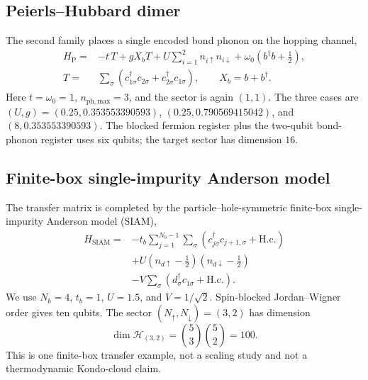 \documentclass[
  reprint,
  amsmath,
  amssymb,
  aps,
  pra,
  nofootinbib,
  superscriptaddress,
  floatfix
]{revtex4-2}
\newcommand{\phmax}{n_{\mathrm{ph,max}}}
\begin{document}
\subsection{Peierls--Hubbard dimer}
\label{sec:peierls_model}

The second family places a single encoded bond phonon on the hopping channel,
\begin{align}
 H_{\mathrm P}
 =&-t\,T+gX_bT
 +U\sum_{i=1}^{2}n_{i\uparrow}n_{i\downarrow}
 +\omega_0\left(b^{\dagger}b+\frac12\right),
 \label{eq:peierls_hamiltonian}\\
 T=&\sum_\sigma
 \left(c_{1\sigma}^{\dagger}c_{2\sigma}
 +c_{2\sigma}^{\dagger}c_{1\sigma}\right),
 \qquad X_b=b+b^{\dagger}.
\end{align}
Here $t=\omega_0=1$, $\phmax=3$, and the sector is again $(1,1)$.
The three cases are $(U,g)=(0.25,0.353553390593)$,
$(0.25,0.790569415042)$, and $(8,0.353553390593)$.  The blocked fermion
register plus the two-qubit bond-phonon register uses six qubits; the target
sector has dimension $16$.

\subsection{Finite-box single-impurity Anderson model}
\label{sec:siam_model}

The transfer matrix is completed by the particle--hole-symmetric finite-box
single-impurity Anderson model (SIAM),
\begin{align}
 H_{\mathrm{SIAM}}=&-t_b\sum_{j=1}^{N_b-1}\sum_\sigma
 \left(c_{j\sigma}^{\dagger}c_{j+1,\sigma}+\mathrm{H.c.}\right)
 \nonumber\\
 &+U\left(n_{d\uparrow}-\frac12\right)
       \left(n_{d\downarrow}-\frac12\right)
 \nonumber\\
 &-V\sum_\sigma
 \left(d_\sigma^{\dagger}c_{1\sigma}+\mathrm{H.c.}\right).
 \label{eq:siam_hamiltonian}
\end{align}
We use $N_b=4$, $t_b=1$, $U=1.5$, and $V=1/\sqrt2$.  Spin-blocked
Jordan--Wigner order gives ten qubits.  The sector
$(N_\uparrow,N_\downarrow)=(3,2)$ has dimension
\begin{equation}
 \dim\mathcal H_{(3,2)}=\binom{5}{3}\binom{5}{2}=100.
 \label{eq:siam_sector_dimension}
\end{equation}
This is one finite-box transfer example,
not a scaling study and not a thermodynamic Kondo-cloud claim.
\end{document}
